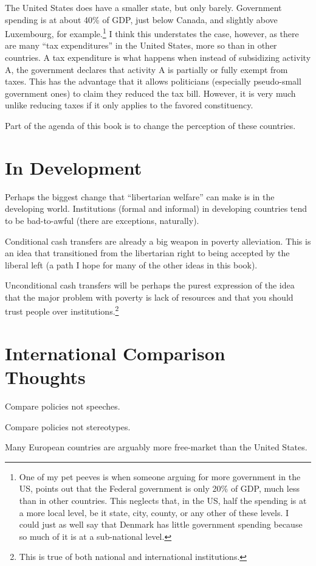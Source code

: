 The United States does have a smaller state, but only barely. Government
spending is at about 40\% of GDP, just below Canada, and slightly above
Luxembourg, for example.\footnote{One of my pet peeves is when someone arguing
for more government in the US, points out that the Federal government is only
20\% of GDP, much less than in other countries. This neglects that, in the US,
half the spending is at a more local level, be it state, city, county, or any
other of these levels. I could just as well say that Denmark has little
government spending because so much of it is at a sub-national level.} I think
this understates the case, however, as there are many ``tax expenditures'' in
the United States, more so than in other countries. A tax expenditure is what
happens when instead of subsidizing activity A, the government declares that
activity A is partially or fully exempt from taxes. This has the advantage that
it allows politicians (especially pseudo-small government ones) to claim they
reduced the tax bill. However, it is very much unlike reducing taxes if it only
applies to the favored constituency.

Part of the agenda of this book is to change the perception of these countries.

\section{In Development}

Perhaps the biggest change that ``libertarian welfare'' can make is in the
developing world. Institutions (formal and informal) in developing countries
tend to be bad-to-awful (there are exceptions, naturally).

Conditional cash transfers are already a big weapon in poverty alleviation.
This is an idea that transitioned from the libertarian right to being accepted
by the liberal left (a path I hope for many of the other ideas in this book).

Unconditional cash transfers will be perhaps the purest expression of the idea
that the major problem with poverty is lack of resources and that you should
trust people over institutions.\footnote{This is true of both national and
international institutions.} 

\section{International Comparison Thoughts}

\thought Compare policies not speeches.

\thought Compare policies not stereotypes.

\thought Many European countries are arguably more free-market than the United
States.

